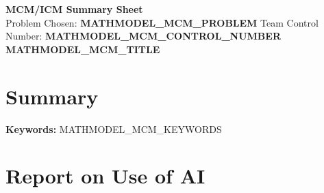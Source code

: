 \documentclass[12pt,letterpaper]{article}
\begin{document}
\thispagestyle{fancy}
\begin{center}
\textbf{\Large MCM/ICM Summary Sheet}\\[0.6cm]
{\large Problem Chosen: \textbf{MATHMODEL_MCM_PROBLEM}}\hfill
{\large Team Control Number: \textbf{MATHMODEL_MCM_CONTROL_NUMBER}}\\[0.7cm]
{\LARGE \textbf{MATHMODEL_MCM_TITLE}}
\end{center}

\section*{Summary}

\textbf{Keywords:} MATHMODEL_MCM_KEYWORDS
\clearpage










\appendix

\clearpage
\section*{Report on Use of AI}
\end{document}
